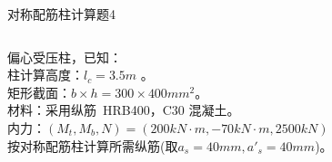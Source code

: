 \begin{frame}[plain]{ 对称配筋柱计算题4 }
\begin{columns}[onlytextwidth]
\begin{column}{0.75\textwidth}
偏心受压柱，已知：\\
柱计算高度：$l_c= 3.5 m$ 。 \\
矩形截面：$b \times h = 300 \times 400 mm^2$。\\
材料：采用纵筋~HRB400，C30 混凝土。\\
内力：$(M_t, M_b, N) = ( 200 kN\cdot m, -70 kN\cdot m, 2500 kN)$ \\
按对称配筋柱计算所需纵筋(取$a_s = 40 mm, a'_s = 40 mm$)。\\
\end{column}

\begin{column}{0.25\textwidth}
\begin{center}
\end{center}
\end{column}

\end{columns}
\end{frame}

